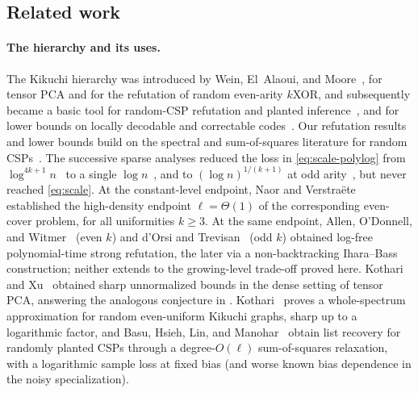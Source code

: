 \documentclass[11pt]{article}
\theoremstyle{definition}
\theoremstyle{remark}
\newcommand{\1}{\mathbf 1}
\numberwithin{equation}{section}
\begin{document}
\subsection{Related work}\label{sec:related}

\paragraph{The hierarchy and its uses.}
The Kikuchi hierarchy was introduced by Wein, El~Alaoui, and
Moore~\cite{WEM}, for tensor PCA and for the refutation of random
even-arity $k$XOR, and subsequently became a basic tool for random-CSP
refutation and planted inference~\cite{GKM,HKM,HKMMS,SOKB}, and for
lower bounds on locally decodable and correctable
codes~\cite{AGKM,KothariManohar}.  Our refutation results and lower bounds build on the
spectral and sum-of-squares literature for random
CSPs~\cite{Feige02,CGL,AOW,BarakMoitra,RRS,GKM,Grigoriev,Schoenebeck,KMOW}.
The successive sparse analyses reduced the loss in
\cref{eq:scale-polylog} from $\log^{4k+1}n$~\cite{GKM} to a single
$\log n$~\cite{HKM}, and to $(\log n)^{1/(k+1)}$ at odd
arity~\cite{HKMMS}, but never reached \cref{eq:scale}.  At the
constant-level endpoint, Naor and
Verstra\"ete~\cite{NaorVerstraete} established the high-density
endpoint $\ell=\Theta(1)$ of the corresponding even-cover problem, for
all uniformities $k\ge3$. At the same endpoint, Allen, O'Donnell, and Witmer~\cite{AOW} (even $k$) 
and d'Orsi and
Trevisan~\cite{dOrsiTrevisan} (odd $k$) obtained log-free polynomial-time strong
refutation, the later via a non-backtracking Ihara--Bass
construction; neither extends to the growing-level trade-off proved
here.  %
Kothari and Xu~\cite{KX} obtained sharp unnormalized bounds in the dense
setting of tensor PCA, answering the analogous conjecture in \cite{WEM}.  Kothari~\cite{KothariECCC} proves a
whole-spectrum approximation for random even-uniform Kikuchi graphs,
sharp up to a logarithmic factor, and Basu, Hsieh, Lin, and
Manohar~\cite{BHLM} obtain list recovery for randomly planted CSPs
through a degree-$O(\ell)$ sum-of-squares relaxation, with a
logarithmic sample loss at fixed bias (and worse known bias dependence
in the noisy specialization).
\end{document}
